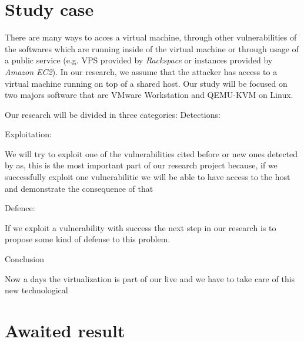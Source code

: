 \section{Study case}
There are many ways to acces a virtual machine, through other vulnerabilities of
the softwares which are running inside of the virtual machine or through
usage of a public service (e.g. VPS provided by \emph{Rackspace} or instances
provided by \emph{Amazon EC2}).
In our research, we assume that the attacker has access to a virtual machine
running on top of a shared host.
Our study will be focused on two majors software that are VMware Workstation and QEMU-KVM on Linux.


Our research will be divided in three categories:
Detections:

Exploitation:

We will try to exploit one of the vulnerabilities cited before or new ones
detected by as, this is the most important part of our research project because,
if we successfully exploit one vulnerabilitie we will be able to have access to
the host and demonstrate the consequence of that

Defence:

If we exploit a vulnerability with success the next step in our research is to
propose some kind of defense to this problem.

Conclusion

Now a days the virtualization is part of our live and we have to take care of
this new technological


\section{Awaited result}

